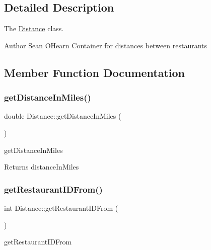\subsection{Detailed Description}
The \hyperlink{class_distance}{Distance} class. 

\begin{DoxyAuthor}{Author}
Sean O\textquotesingle{}Hearn Container for distances between restaurants 
\end{DoxyAuthor}


\subsection{Member Function Documentation}
\mbox{\label{class_distance_acc0170b8899fed2a86e4487e12b1ebe9}} 
\subsubsection{\texorpdfstring{get\+Distance\+In\+Miles()}{getDistanceInMiles()}}
{\footnotesize\ttfamily double Distance\+::get\+Distance\+In\+Miles (\begin{DoxyParamCaption}{ }\end{DoxyParamCaption})}



get\+Distance\+In\+Miles 

\begin{DoxyReturn}{Returns}
distance\+In\+Miles 
\end{DoxyReturn}
\mbox{\label{class_distance_a6aad4761255f0a1dafafab7e98283a81}} 
\subsubsection{\texorpdfstring{get\+Restaurant\+I\+D\+From()}{getRestaurantIDFrom()}}
{\footnotesize\ttfamily int Distance\+::get\+Restaurant\+I\+D\+From (\begin{DoxyParamCaption}{ }\end{DoxyParamCaption})}



get\+Restaurant\+I\+D\+From 

